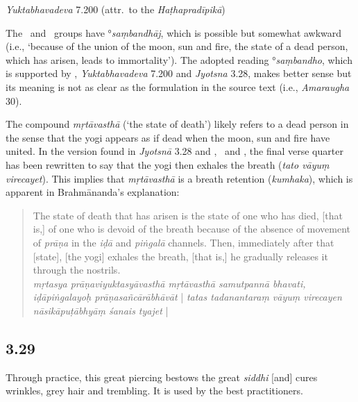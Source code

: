 \begin{ekdosis}
\begin{testimonia}[hp03_028]
\emph{Yuktabhavadeva} 7.200 (attr.~to the \emph{Haṭhapradīpikā})
\begin{versinnote}
\end{versinnote}
\end{testimonia}

\begin{philcomm}[hp03_028]
The \textalpha\ and \textgamma\ groups have °\emph{saṃbandhāj}, which is possible but somewhat awkward (i.e., `because of the union of the moon, sun and fire, the state of a dead person, which has arisen, leads to immortality'). The adopted reading °\emph{saṃbandho}, which is supported by \epsilonTwo, \emph{Yuktabhavadeva} 7.200 and \emph{Jyotsna} 3.28, makes better sense but its meaning is not as clear as the formulation in the source text (i.e., \emph{Amaraugha} 30).

The compound \emph{mṛtāvasthā} (`the state of death') likely refers to a dead person in the sense that the yogi appears as if dead when the moon, sun and fire have united. In the version found in \emph{Jyotsnā} 3.28 and \etaOne, \etaTwo\ and \epsilonThree, the final verse quarter has been rewritten to say that the yogi then exhales the breath (\emph{tato vāyuṃ virecayet}). This implies that \emph{mṛtāvasthā} is a breath retention (\emph{kumhaka}), which is apparent in Brahmānanda's explanation:
\begin{quote}
The state of death that has arisen is the state of one who has died, [that is,] of one who is devoid of the breath because of the absence of movement of \emph{prāṇa} in the \emph{iḍā} and \emph{piṅgalā} channels. Then, immediately after that [state], [the yogi] exhales the breath, [that is,] he gradually releases it through the nostrils.\\
\emph{mṛtasya prāṇaviyuktasyāvasthā mṛtāvasthā samutpannā bhavati, iḍāpiṅgalayoḥ prāṇasañcārābhāvāt} | \emph{tatas tadanantaraṃ vāyuṃ virecayen nāsikāpuṭābhyāṃ śanais tyajet} |
\end{quote}

\end{philcomm}

\subsection*{3.29}
\begin{translation}[hp03_029]
Through practice, this great piercing bestows the great \emph{siddhi} [and] cures wrinkles, grey hair and trembling. It is used by the best practitioners.
\end{translation}


\end{ekdosis}
